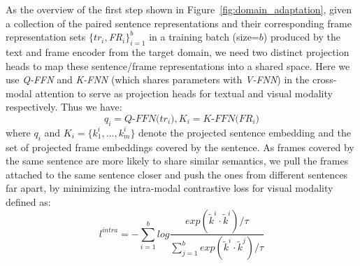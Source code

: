 \documentclass[runningheads]{llncs}
\begin{document}
As the overview of the first step shown in Figure~\ref{fig:domain_adaptation}, given a collection of the paired sentence representations and their corresponding frame representation sets $\{tr_i, $\textit{FR}$_i\}_{i=1}^{b}$ in a training batch (size=$b$) produced by the text and frame encoder from the target domain, %
we need two distinct projection heads to map these sentence/frame representations 
into a shared space. Here we use \textit{Q-FFN} and \textit{K-FNN} (which shares parameters with \textit{V-FNN}) in the cross-modal attention to serve as projection heads for textual and visual modality respectively. Thus we have:
\vspace{-2 mm}
\begin{equation}
    q_i = \textit{Q-FFN(}tr_i\textit{)}, K_i = \textit{K-FFN(}FR_i\textit{)} \label{eq:4}
\end{equation}
where $q_i$ and $K_i=\{ k^i_1, ... , k^i_m\}$ denote the projected sentence embedding and %
the set of projected frame embeddings covered by the sentence. As frames covered by the same sentence are more likely to share similar semantics, we pull the frames attached to the same sentence closer and push the ones from different sentences far apart, by minimizing the intra-modal contrastive loss for visual modality defined as:
\vspace{-4mm}
\begin{equation}
    l^{intra} = -\sum_{i=1}^b log\frac{exp(\tilde{k}^i \cdot \tilde{k}^i)/\tau}{\sum_{j=1}^b exp(\tilde{k}^i \cdot \tilde{k}^j)/\tau} \label{eq:5}
\end{equation}
\end{document}
